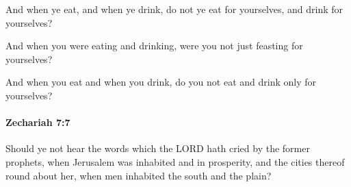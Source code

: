			\begin{versebox}
					\item[BHS] 
					\item[LXX] 
					\item[ASV] And when ye eat, and when ye drink, do not ye eat for yourselves, and drink for yourselves?
					\item[NIV] And when you were eating and drinking, were you not just feasting for yourselves?
					\item[NRSV] And when you eat and when you drink, do you not eat and drink only for yourselves?
			\end{versebox}

		\paragraph{Zechariah 7:7} %
			\label{ZECHARIAH-7-7}

			Should ye not hear the words which the LORD hath cried by the former prophets, when Jerusalem was inhabited and in prosperity, and the cities thereof round about her, when men inhabited the south and the plain?

